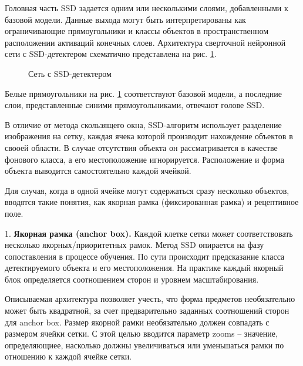 \documentclass[14pt,a4paper]{extarticle}
\begin{document}
Головная часть SSD задается одним или несколькими слоями, добавленными к базовой модели. Данные выхода могут быть интерпретированы как ограничивающие прямоугольники и классы объектов в пространственном расположении активаций конечных слоев. Архитектура сверточной нейронной сети с SSD-детектером схематично представлена на рис. \ref{ssd_fig_lbl}.
\begin{figure}[h]
\caption{Сеть с SSD-детектером}
\label{ssd_fig_lbl}
\end{figure}  

Белые прямоугольники на рис. \ref{ssd_fig_lbl} соответствуют базовой модели, а последние слои, представленные синими прямоугольниками, отвечают голове SSD. 

В отличие от метода скользящего окна, SSD-алгоритм использует разделение изображения на сетку, каждая ячека которой производит нахождение объектов в свооей области. В случае отсутствия объекта он рассматривается в качестве фонового класса, а его местоположение игнорируется. Расположение и форма объекта выводится самостоятельно каждой ячейкой. 

Для случая, когда в одной ячейке могут содержаться сразу несколько объектов, вводятся такие понятия, как якорная рамка (фиксированная рамка) и рецептивное поле.

1. \textbf{Якорная рамка (anchor box).} Каждой клетке сетки может соответствовать несколько якорных/приоритетных рамок. Метод SSD опирается на фазу сопоставления в процессе обучения. По сути происходит предсказание класса детектируемого объекта и его местоположения. На практике каждый якорный блок определяется соотношением сторон и уровнем масштабирования. 

Описываемая архитектура позволяет учесть, что форма предметов необязательно может быть квадратной, за счет предварительно заданных соотношений сторон для anchor box. Размер якорной рамки необязательно должен совпадать с размером ячейки сетки. С этой целью вводится параметр zooms -- значение, определяющиее, насколько должны увеличиваться или уменьшаться рамки по отношению к каждой ячейке сетки. 
\end{document}

